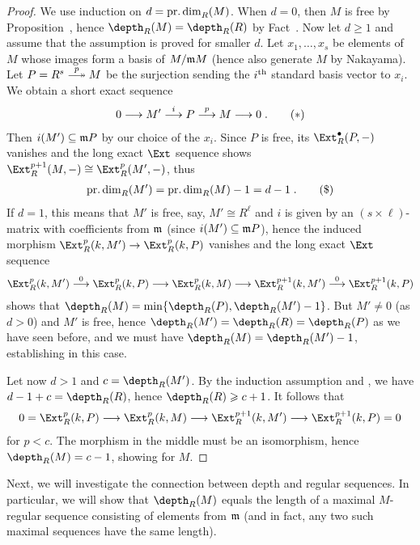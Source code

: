 \documentclass[a4paper,parskip=half,numbers=enddot, DIV=12]{scrreprt}
\renewcommand{\geq}{\geqslant}
\begin{document}
\begin{proof}
	We use induction on $d=\operatorname{pr.dim}_R(M)$. When $d=0$, then $M$ is free by Proposition~, hence $\depth_R(M)=\depth_R(R)$ by Fact~. Now let $d\geq 1$ and assume that the assumption is proved for smaller $d$. Let $x_1,\ldots,x_s$ be elements of $M$ whose images form a basis of $M/\mathfrak{m} M$ (hence also generate $M$ by Nakayama). Let $P=R^s\epimorphism[p] M$ be the surjection sending the $i^{\text{th}}$ standard basis vector to $x_i$. We obtain a short exact sequence
	\begin{align}\lbl{eq:exactSeq1}
		0\morphism M'\morphism[i] P\morphism[p] M\morphism 0\;.\tag{$*$}
	\end{align}
	Then $i(M')\subseteq \mathfrak{m} P$ by our choice of the $x_i$. Since $P$ is free, its $\Ext_R^\bullet(P,-)$ vanishes and the long exact $\Ext$ sequence shows $\Ext_R^{p+1}(M,-)\cong \Ext_R^p(M',-)$, thus 
	\begin{align}\lbl{eq:depthInduction}
		\pdim_R(M')=\pdim_R(M)-1=d-1\;.\tag{\$}
	\end{align}
	If $d=1$, this means that $M'$ is free, say, $M'\cong R^\ell$ and $i$ is given by an $(s\times \ell)$-matrix with coefficients from $\mathfrak{m}$ (since $i(M')\subseteq \mathfrak{m} P$), hence the induced morphism $\Ext_R^p(k,M')\morphism\Ext_R^p(k,P)$ vanishes and the long exact $\Ext$ sequence
	\begin{align*}
		\Ext_R^p(k,M')\morphism[0]\Ext_R^p(k,P)\morphism\Ext_R^p(k,M)\morphism\Ext_R^{p+1}(k,M')\morphism[0]\Ext_R^{p+1}(k,P)
	\end{align*}
	shows that $\depth_R(M)=\min\{\depth_R(P),\depth_R(M')-1\}$. But $M'\neq 0$ (as $d>0$) and $M'$ is free, hence $\depth_R(M')=\depth_R(R)=\depth_R(P)$ as we have seen before, and we must have $\depth_R(M)=\depth_R(M')-1$, establishing  in this case.
	
	Let now $d>1$ and $c=\depth_R(M')$. By the induction assumption and , we have $d-1+c=\depth_R(R)$, hence $\depth_R(R)\geq c+1$. It follows that
	\begin{align*}
		0=\Ext_R^p(k,P)\morphism\Ext_R^p(k,M)\morphism\Ext_R^{p+1}(k,M')\morphism\Ext_R^{p+1}(k,P)=0
	\end{align*}
	for $p<c$. The morphism in the middle must be an isomorphism, hence $\depth_R(M)=c-1$, showing  for $M$.
\end{proof}
Next, we will investigate the connection between depth and regular sequences. In particular, we will show that $\depth_R(M)$ equals the length of a maximal $M$-regular sequence consisting of elements from $\mathfrak{m}$ (and in fact, any two such maximal sequences have the same length).
\end{document}
